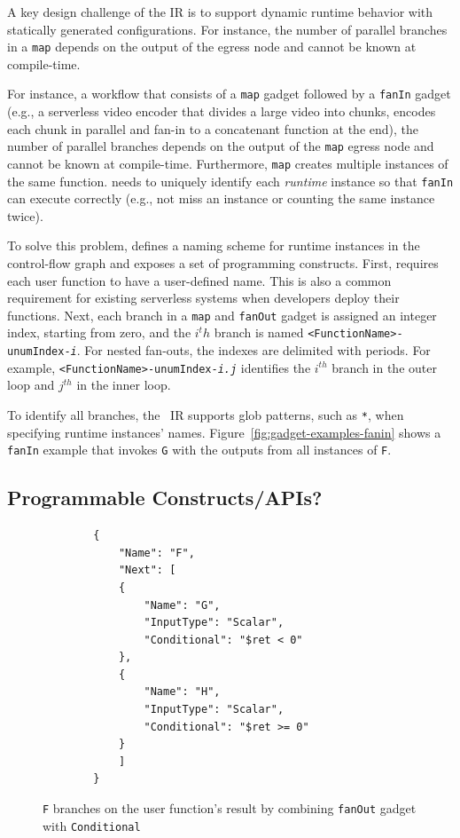 A key design challenge of the \name{} IR is to support dynamic runtime
behavior with statically generated configurations. For instance, the number of
parallel branches in a \texttt{map} depends on the output of the egress node
and cannot be known at compile-time. 

For instance, a workflow that consists of a \texttt{map} gadget followed by a
\texttt{fanIn} gadget (e.g., a serverless video encoder that divides a large
video into chunks, encodes each chunk in parallel and fan-in to a concatenant
function at the end), the number of parallel branches depends on the output of
the \texttt{map} egress node and cannot be known at compile-time. Furthermore,
\texttt{map} creates multiple instances of the same function. \name{} needs to
uniquely identify each \emph{runtime} instance so that \texttt{fanIn} can
execute correctly (e.g., not miss an instance or counting the same instance
twice).

To solve this problem, \name{} defines a naming scheme for runtime instances
in the control-flow graph and exposes a set of programming constructs. First,
\name{} requires each user function to have a user-defined name. This is also
a common requirement for existing serverless systems when developers deploy
their functions. Next, each branch in a \texttt{map} and \texttt{fanOut}
gadget is assigned an integer index, starting from zero, and the $i^th$ branch
is named \texttt{<FunctionName>-unumIndex-\emph{i}}. For nested fan-outs, the
indexes are delimited with periods. For example,
\texttt{<FunctionName>-unumIndex-\emph{i.j}} identifies the $i^{th}$ branch in
the outer loop and $j^{th}$ in the inner loop.

To identify all branches, the \name{}~IR supports glob patterns, such as
\texttt{*}, when specifying runtime instances' names.
Figure~\ref{fig:gadget-examples-fanin} shows a \texttt{fanIn} example that
invokes \texttt{G} with the outputs from all instances of \texttt{F}.

\subsection{Programmable Constructs/APIs?}

\begin{figure}[]
	\begin{verbatim}
		{
			"Name": "F",
			"Next": [
			{
				"Name": "G",
				"InputType": "Scalar",
				"Conditional": "$ret < 0"
			},
			{
				"Name": "H",
				"InputType": "Scalar",
				"Conditional": "$ret >= 0"
			}
			]
		}
	\end{verbatim}
	\caption{\texttt{F} branches on the user function's result by
		combining \texttt{fanOut} gadget with \texttt{Conditional}}
	\label{fig:gadget-examples-branch}
\end{figure}

